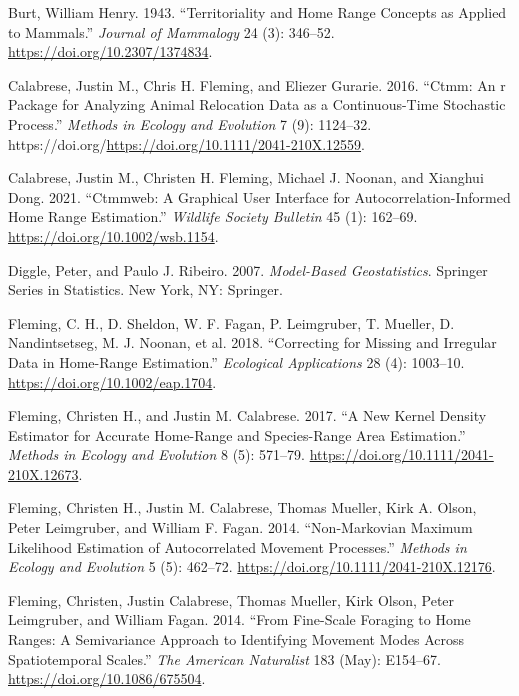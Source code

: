 \documentclass[
]{article}
\newlength{\cslhangindent}
\newenvironment{CSLReferences}[2] %
 {\begin{list}{}{%
  \setlength{\itemindent}{0pt}
  \setlength{\leftmargin}{0pt}
  \setlength{\parsep}{0pt}
  \ifodd #1
   \setlength{\leftmargin}{\cslhangindent}
   \setlength{\itemindent}{-1\cslhangindent}
  \fi
  \setlength{\itemsep}{#2\baselineskip}}}
 {\end{list}}
\begin{document}
\label{refs}
\begin{CSLReferences}{1}{0}
Burt, William Henry. 1943. {``Territoriality and Home Range Concepts as
Applied to Mammals.''} \emph{Journal of Mammalogy} 24 (3): 346--52.
\url{https://doi.org/10.2307/1374834}.

Calabrese, Justin M., Chris H. Fleming, and Eliezer Gurarie. 2016.
{``Ctmm: An r Package for Analyzing Animal Relocation Data as a
Continuous-Time Stochastic Process.''} \emph{Methods in Ecology and
Evolution} 7 (9): 1124--32.
https://doi.org/\url{https://doi.org/10.1111/2041-210X.12559}.

Calabrese, Justin M., Christen H. Fleming, Michael J. Noonan, and
Xianghui Dong. 2021. {``Ctmmweb: A Graphical User Interface for
Autocorrelation-Informed Home Range Estimation.''} \emph{Wildlife
Society Bulletin} 45 (1): 162--69.
\url{https://doi.org/10.1002/wsb.1154}.

Diggle, Peter, and Paulo J. Ribeiro. 2007. \emph{Model-Based
Geostatistics}. Springer Series in Statistics. New York, NY: Springer.

Fleming, C. H., D. Sheldon, W. F. Fagan, P. Leimgruber, T. Mueller, D.
Nandintsetseg, M. J. Noonan, et al. 2018. {``Correcting for Missing and
Irregular Data in Home-Range Estimation.''} \emph{Ecological
Applications} 28 (4): 1003--10. \url{https://doi.org/10.1002/eap.1704}.

Fleming, Christen H., and Justin M. Calabrese. 2017. {``A New Kernel
Density Estimator for Accurate Home-Range and Species-Range Area
Estimation.''} \emph{Methods in Ecology and Evolution} 8 (5): 571--79.
\url{https://doi.org/10.1111/2041-210X.12673}.

Fleming, Christen H., Justin M. Calabrese, Thomas Mueller, Kirk A.
Olson, Peter Leimgruber, and William F. Fagan. 2014. {``Non-Markovian
Maximum Likelihood Estimation of Autocorrelated Movement Processes.''}
\emph{Methods in Ecology and Evolution} 5 (5): 462--72.
\url{https://doi.org/10.1111/2041-210X.12176}.

Fleming, Christen, Justin Calabrese, Thomas Mueller, Kirk Olson, Peter
Leimgruber, and William Fagan. 2014. {``From Fine-Scale Foraging to Home
Ranges: A Semivariance Approach to Identifying Movement Modes Across
Spatiotemporal Scales.''} \emph{The American Naturalist} 183 (May):
E154--67. \url{https://doi.org/10.1086/675504}.


\end{CSLReferences}
\end{document}
